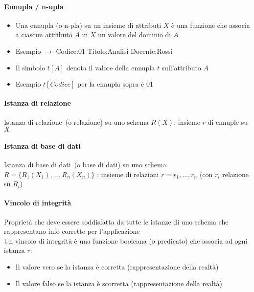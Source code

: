 \documentclass[12pt]{article}
\begin{document}
    \paragraph{Ennupla / n-upla}
    \begin{itemize}
        \item Una ennupla (o n-pla) su un insieme di attributi $X$  è una funzione che associa a ciascun attributo $A$ in $X$  un valore del dominio di $A$
        \item Esempio $\rightarrow$ Codice:01 Titolo:Analisi Docente:Rossi
        \item Il simbolo $t[A]$ denota il valore della ennupla $t$ sull'attributo $A$
        \item Esempio $t[Codice]$ per la ennupla sopra è 01      
    \end{itemize}
    \paragraph{Istanza di relazione}
    Istanza di relazione (o relazione) su uno schema $R(X)$: insieme  $r$  di ennuple su $X$
    \paragraph{Istanza di base di dati}
    Istanza di base di dati (o base di dati) su uno schema  $R= \{R_1(X_1), \dots, R_n(X_n)\}$ : insieme di relazioni $r = {r_1, \dots, r_n}$ (con  $r_i$  relazione su  $R_i$) 
    \paragraph{Vincolo di integrità}
    Proprietà che deve essere soddisfatta da tutte le istanze di uno schema che rappresentano info corrette per l’applicazione\\
    Un vincolo di integrità è una funzione booleana (o predicato) che associa ad ogni istanza $r$:
    \begin{itemize}
        \item Il valore vero se la istanza è corretta (rappresentazione della realtà)
        \item Il valore falso se la istanza è scorretta (rappresentazione della realtà)
    \end{itemize}
\end{document}
